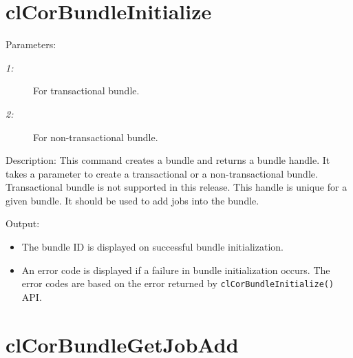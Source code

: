 \begin{flushleft}
\section{clCorBundleInitialize}
\begin{Desc}
\item
[Parameters:]
\begin{description}
\item[{\em 1:}] For transactional bundle.
\item[{\em 2:}] For non-transactional bundle.
\end{description}
\end{Desc}

\begin{Desc}
\item
[Description:]
This command creates a bundle and returns a bundle handle. It takes a parameter to create a transactional or a non-transactional bundle. Transactional 
bundle is not supported in this release. This handle is unique for a given bundle. It should be used to add jobs into the bundle.
\end{Desc}

\begin{Desc}
\item
[Output:]
\begin{itemize}
\item
The bundle ID is displayed on successful bundle initialization.
\item
An error code is displayed if a failure in bundle initialization occurs. The error codes are based on the error returned by {\tt{clCorBundleInitialize()}}
API.
\end{itemize}
\end{Desc}



\section{clCorBundleGetJobAdd}


\end{flushleft}
